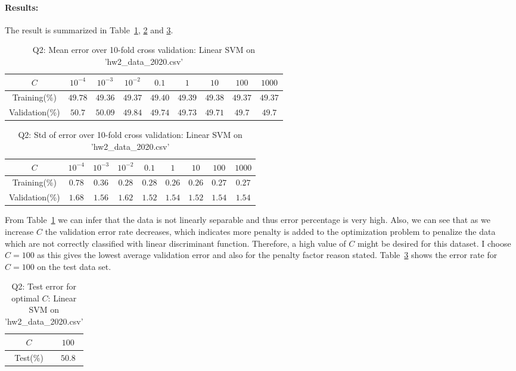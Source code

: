 \paragraph{Results:} The result is summarized in Table~\ref{tbl:q2_mean_diff_c}, \ref{tbl:q2_std_diff_c} and \ref{tbl:q2_test_error}.
\begin{table}[ht]
	\centering
	\caption{Q2: Mean error over 10-fold cross validation: Linear SVM on 'hw2\_data\_2020.csv'}
	\begin{tabular}[t]{ccccccccc} 
		\hline
		$C$ & $10^{-4}$ & $10^{-3}$ & $10^{-2}$ & $0.1$ & $1$ & $10$ & $100$ & $1000$\\ [0.5ex] 
		\hline
		Training(\%) & $49.78$ & $49.36$ & $49.37$ & $49.40$ & $49.39$ & $49.38$ & $49.37$ & $49.37$\\
		Validation(\%) & $50.7$ & $50.09$ & $49.84$ & $49.74$ & $49.73$ & $49.71$ & $49.7$ & $49.7$\\[1ex]
		\hline
	\end{tabular}
	\label{tbl:q2_mean_diff_c}
\end{table}
\begin{table}[ht]
	\centering
	\caption{Q2: Std of error over 10-fold cross validation: Linear SVM on 'hw2\_data\_2020.csv'}
	\begin{tabular}[t]{ccccccccc} 
		\hline
		$C$ & $10^{-4}$ & $10^{-3}$ & $10^{-2}$ & $0.1$ & $1$ & $10$ & $100$ & $1000$\\ [0.5ex] 
		\hline
		Training(\%) & $0.78$ & $0.36$ & $0.28$ & $0.28$ & $0.26$ & $0.26$ & $0.27$ & $0.27$\\
		Validation(\%) & $1.68$ & $1.56$ & $1.62$ & $1.52$ & $1.54$ & $1.52$ & $1.54$ & $1.54$\\[1ex]
		\hline
	\end{tabular}
	\label{tbl:q2_std_diff_c}
\end{table}
From Table~\ref{tbl:q2_mean_diff_c} we can infer that the data is not linearly separable and thus error percentage is very high. Also, we can see that as we increase $C$ the validation error rate decreases, which indicates more penalty is added to the optimization problem to penalize the data which are not correctly classified with linear discriminant function. Therefore, a high value of $C$ might be desired for this dataset. I choose $C=100$ as this gives the lowest average validation error and also for the penalty factor reason stated. Table~\ref{tbl:q2_test_error} shows the error rate for $C=100$ on the test data set.
\begin{table}[ht]
	\centering
	\caption{Q2: Test error for optimal $C$: Linear SVM on 'hw2\_data\_2020.csv'}
	\begin{tabular}[t]{cc} 
		\hline
		$C$ & $100$ \\ [0.5ex] 
		\hline
		Test(\%) & $50.8$\\[1ex]
		\hline
	\end{tabular}
	\label{tbl:q2_test_error}
\end{table}